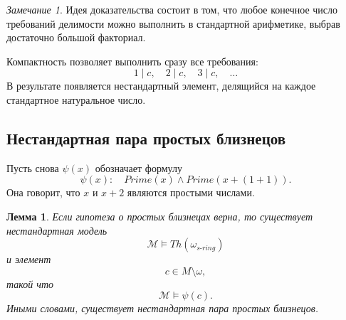 \documentclass[12pt,a4paper,oneside,openany]{book}
\theoremstyle{definition}
\theoremstyle{plain}
\newtheorem{lemma}{Лемма}[chapter]
\theoremstyle{remark}
\newtheorem{remark}{Замечание}[chapter]
\begin{document}
\begin{remark}
Идея доказательства состоит в том, что любое конечное число требований делимости можно выполнить в стандартной арифметике, выбрав достаточно большой факториал.

Компактность позволяет выполнить сразу все требования:
\[
1\mid c,\quad 2\mid c,\quad 3\mid c,\quad \ldots
\]
В результате появляется нестандартный элемент, делящийся на каждое стандартное натуральное число.
\end{remark}

\subsection{Нестандартная пара простых близнецов}

Пусть снова \(\psi(x)\) обозначает формулу
\[
\psi(x):
\quad
Prime(x)\wedge Prime(x+(1+1)).
\]
Она говорит, что \(x\) и \(x+2\) являются простыми числами.

\begin{lemma}
Если гипотеза о простых близнецах верна, то существует нестандартная модель
\[
\mathcal M\models Th(\omega_{s\text{-}ring})
\]
и элемент
\[
c\in M\setminus\omega,
\]
такой что
\[
\mathcal M\models \psi(c).
\]
Иными словами, существует нестандартная пара простых близнецов.
\end{lemma}
\end{document}
